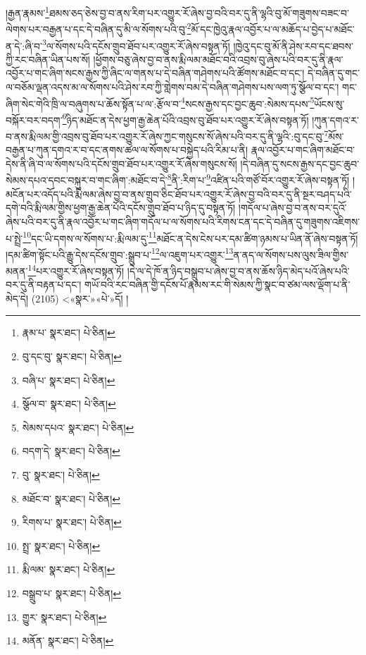 །རྒྱན་རྣམས་\footnote{རྣམ་པ་  སྣར་ཐང་།  པེ་ཅིན། }ཐམས་ཅད་ཅེས་བྱ་བ་ནས་རིག་པར་འགྱུར་རོ་ཞེས་བྱ་བའི་བར་དུ་ནི་ལྷའི་བུ་མོ་གཟུགས་བཟང་བ་ལེགས་པར་བརྒྱན་པ་དང་དེ་བཞིན་དུ་མི་ལ་སོགས་པའི་བུ་\footnote{བུ་དང་བུ་  སྣར་ཐང་།  པེ་ཅིན། }མོ་དང་ཁྱེའུ་རྣལ་འབྱོར་པ་ལ་མཆོད་པ་བྱེད་པ་མཐོང་ན་དེ་:ཞི་བ་\footnote{བཞི་པ་  སྣར་ཐང་།  པེ་ཅིན། }ལ་སོགས་པའི་དངོས་གྲུབ་ཐོབ་པར་འགྱུར་རོ་ཞེས་བསྟན་ཏོ། །ཁྱེའུ་དང་བུ་མོ་ནི་ཤེས་རབ་དང་ཐབས་ཀྱི་རང་བཞིན་ཡིན་པས་སོ། །ཕྱོགས་བཅུ་ཞེས་བྱ་བ་ནས་རྨི་ལམ་མཐོང་བའི་འབྲས་བུ་ཞེས་པའི་བར་དུ་ནི་རྣལ་འབྱོར་པ་གང་ཞིག་སངས་རྒྱས་ཀྱི་ཞིང་ལ་གནས་པ་དེ་བཞིན་གཤེགས་པའི་ཚོགས་མཐོང་བ་དང་། དེ་བཞིན་དུ་གང་ལ་བཅོམ་ལྡན་འདས་མ་ལ་སོགས་པའི་ཤེས་རབ་ཀྱི་གླེགས་བམ་དེ་བཞིན་གཤེགས་པས་ལག་ཏུ་སྩོལ་བ་དང་། གང་ཞིག་སེང་གེའི་ཁྲི་ལ་བཞུགས་པ་ཆོས་སྟོན་པ་ལ་:རྩོལ་བ་\footnote{སྩོལ་བ་  སྣར་ཐང་།  པེ་ཅིན། }སངས་རྒྱས་དང་བྱང་ཆུབ་:སེམས་དཔས་\footnote{སེམས་དཔའ་  སྣར་ཐང་།  པེ་ཅིན། }ཡོངས་སུ་བསྐོར་བར་བདག་\footnote{བདག་དེ་  སྣར་ཐང་།  པེ་ཅིན། }ཉིད་མཐོང་ན་དེས་ཕྱག་རྒྱ་ཆེན་པོའི་འབྲས་བུ་ཐོབ་པར་འགྱུར་རོ་ཞེས་བསྟན་ཏོ། །ཀུན་དགའ་ར་བ་ནས་རྨི་ལམ་གྱི་འབྲས་བུ་ཐོབ་པར་འགྱུར་རོ་ཞེས་ཀྱང་གསུངས་སོ་ཞེས་པའི་བར་དུ་ནི་ལྷའི་:བུ་དང་བུ་\footnote{བུ་  སྣར་ཐང་།  པེ་ཅིན། }མོས་བརྒྱན་པ་ཀུན་དགའ་ར་བ་དང་ནགས་ཚལ་ལ་སོགས་པ་བསྐྱེད་པའི་རིམ་པ་ནི། རྣལ་འབྱོར་པ་གང་ཞིག་མཐོང་བ་དེས་ནི་ཞི་བ་ལ་སོགས་པའི་དངོས་གྲུབ་ཐོབ་པར་འགྱུར་རོ་ཞེས་གསུངས་སོ། །དེ་བཞིན་དུ་སངས་རྒྱས་དང་བྱང་ཆུབ་སེམས་དཔའ་དབང་བསྐུར་བ་གང་ཞིག་:མཐོང་བ་དེ་\footnote{མཐོང་བ་  སྣར་ཐང་།  པེ་ཅིན། }ནི་:རིག་པ་\footnote{རིགས་པ་  སྣར་ཐང་།  པེ་ཅིན། }འཛིན་པའི་གཙོ་བོར་འགྱུར་རོ་ཞེས་བསྟན་ཏོ། །མངོན་པར་འདོད་པའི་རྨི་ལམ་ཞེས་བྱ་བ་ནས་གྲུབ་ཅིང་ཐོབ་པར་འགྱུར་རོ་ཞེས་བྱ་བའི་བར་དུ་ནི་སྔར་བཤད་པའི་དགེ་བའི་རྨི་ལམ་གྱིས་ཕྱག་རྒྱ་ཆེན་པོའི་དངོས་གྲུབ་ཐོབ་པ་ཉིད་དུ་བསྟན་ཏོ། །གདོལ་པ་ཞེས་བྱ་བ་ནས་བར་དུའོ་ཞེས་པའི་བར་དུ་ནི་རྣལ་འབྱོར་པ་གང་ཞིག་གདོལ་པ་ལ་སོགས་པའི་རིགས་ངན་དང་དེ་བཞིན་དུ་གཟུགས་འཇིགས་པ་སྤྲེ་\footnote{སྤྲ་  སྣར་ཐང་།  པེ་ཅིན། }དང་ཡི་དགས་ལ་སོགས་པ་:རྨི་ལམ་དུ་\footnote{རྨི་ལམ་  སྣར་ཐང་།  པེ་ཅིན། }མཐོང་ན་དེས་ངེས་པར་དམ་ཚིག་ཉམས་པ་ཡིན་ནོ་ཞེས་བསྟན་ཏོ། །དམ་ཚིག་སྟོང་པའི་རྒྱུ་དེས་དངོས་གྲུབ་:སྒྲུབ་པ་\footnote{བསྒྲུབ་པ་  སྣར་ཐང་།  པེ་ཅིན། }ལ་འཇུག་པར་འགྱུར་\footnote{གྱུར་  སྣར་ཐང་།  པེ་ཅིན། }ན་ནད་ལ་སོགས་པས་ལུས་ཟིལ་གྱིས་མནན་\footnote{མནོན་  སྣར་ཐང་།  པེ་ཅིན། }པར་འགྱུར་རོ་ཞེས་བསྟན་ཏོ། །དེ་ལ་དེ་ཁོ་ན་ཉིད་བསྒྲུབ་པ་ཞེས་བྱ་བ་ནས་ཆོས་ཉིད་མེད་པའོ་ཞེས་པའི་བར་དུ་ནི་བརྟན་པ་དང་། གཡོ་བའི་རང་བཞིན་གྱི་དངོས་པོ་རྣམས་རང་གི་སེམས་ཀྱི་སྣང་བ་ཙམ་ལས་ལྡོག་པ་ནི་མེད་དེ། (2105) <«སྣར་»«པེ་»དོ། །
